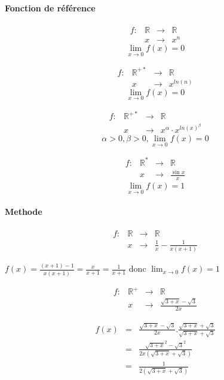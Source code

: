 \paragraph{Fonction de référence}
\[\begin{array}{rccl}
	f: &\mathbb{R} &\rightarrow &\mathbb{R} \\
	& x & \rightarrow &x^n 
\end{array}\]
\[\lim_{x \to 0} f(x) = 0\]


\[\begin{array}{rccl}
	f: &\mathbb{R}^{+*} &\rightarrow &\mathbb{R} \\
	   & x & \rightarrow &x^{ln(n)} 
\end{array}\]
\[\lim_{x \to 0} f(x) = 0\]

\[\begin{array}{rccl}
	f: &\mathbb{R}^{+*} &\rightarrow &\mathbb{R} \\
	   & x & \rightarrow &x^{\alpha} \cdot x^{ln(x)^\beta}
\end{array}\]
\[\alpha >0, \beta>0, \lim_{x \to 0} f(x) = 0\]

\[\begin{array}{rccl}
	f: &\mathbb{R}^* &\rightarrow &\mathbb{R} \\
	   & x & \rightarrow &\frac{\sin{x}}{x}
\end{array}\]
\[\lim_{x \to 0} f(x) = 1\]

\paragraph{Methode}
\[\begin{array}{rccl}
	f:&\mathbb{R} &\rightarrow &\mathbb{R}\\
	  &x& \rightarrow & \frac{1}{x} - \frac{1}{x(x+1)}
\end{array}\]

$f(x) = \frac{(x+1)-1}{x(x+1)} = \frac{x}{x+1} = \frac{1}{x+1}$
donc $\lim_{x \to 0}f(x) = 1$

\[\begin{array}{rccl}
	f:&\mathbb{R}^+ &\rightarrow &\mathbb{R}\\
	  &x& \rightarrow & \frac{\sqrt{3+x} - \sqrt{3}}{2x}
\end{array}\]

\[\begin{array}{rccl}
	f(x) &=& \frac{\sqrt{3+x} - \sqrt{3}}{2x} . \frac{\sqrt{3+x} + \sqrt{3}}{\sqrt{3+x} + \sqrt{3}} \\
			   &=& \frac{\sqrt{3+x}^2 - \sqrt{3}^2}{2x(\sqrt{3+x} + \sqrt{3})} \\
			   &=& \frac{1}{2(\sqrt{3+x}+\sqrt{3})}
\end{array}\]

